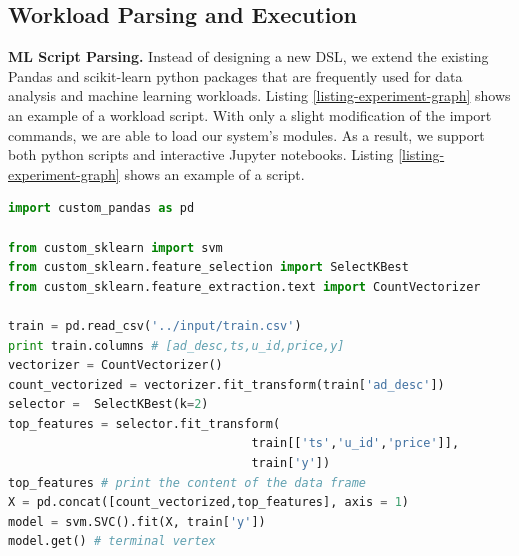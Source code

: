 \subsection{Workload Parsing and Execution}
\textbf{ML Script Parsing.}
Instead of designing a new DSL, we extend the existing Pandas and scikit-learn \cite{sklearn_api} python packages that are frequently used for data analysis and machine learning workloads.
Listing \ref{listing-experiment-graph} shows an example of a workload script.
With only a slight modification of the import commands, we are able to load our system's modules.
As a result, we support both python scripts and interactive Jupyter notebooks.
Listing \ref{listing-experiment-graph} shows an example of a script.
\begin{lstlisting}[language=Python, caption=Example script,captionpos=b,label = {listing-experiment-graph}]
import custom_pandas as pd

from custom_sklearn import svm
from custom_sklearn.feature_selection import SelectKBest
from custom_sklearn.feature_extraction.text import CountVectorizer

train = pd.read_csv('../input/train.csv') 
print train.columns # [ad_desc,ts,u_id,price,y]
vectorizer = CountVectorizer()
count_vectorized = vectorizer.fit_transform(train['ad_desc'])
selector =  SelectKBest(k=2)
top_features = selector.fit_transform(
                                  train[['ts','u_id','price']],  
                                  train['y'])
top_features # print the content of the data frame			     
X = pd.concat([count_vectorized,top_features], axis = 1)
model = svm.SVC().fit(X, train['y'])
model.get() # terminal vertex
\end{lstlisting}

